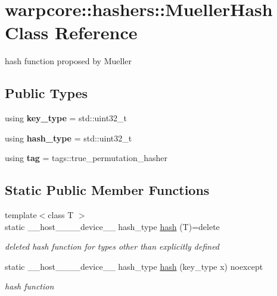 \hypertarget{classwarpcore_1_1hashers_1_1MuellerHash}{}\section{warpcore\+:\+:hashers\+:\+:Mueller\+Hash Class Reference}
\label{classwarpcore_1_1hashers_1_1MuellerHash}


hash function proposed by Mueller  


\subsection*{Public Types}
\begin{DoxyCompactItemize}
\item 
\mbox{\label{classwarpcore_1_1hashers_1_1MuellerHash_a14b100811e97a47b6ba363ee092f664a}} 
using {\bfseries key\+\_\+type} = std\+::uint32\+\_\+t
\item 
\mbox{\label{classwarpcore_1_1hashers_1_1MuellerHash_a9085ddbded055d883f0f7a45b989a33e}} 
using {\bfseries hash\+\_\+type} = std\+::uint32\+\_\+t
\item 
\mbox{\label{classwarpcore_1_1hashers_1_1MuellerHash_adf2a377e994efb65673b4db651e0a2df}} 
using {\bfseries tag} = tags\+::true\+\_\+permutation\+\_\+hasher
\end{DoxyCompactItemize}
\subsection*{Static Public Member Functions}
\begin{DoxyCompactItemize}
\item 
{\footnotesize template$<$class T $>$ }\\static \+\_\+\+\_\+host\+\_\+\+\_\+\+\_\+\+\_\+device\+\_\+\+\_\+ hash\+\_\+type \hyperlink{classwarpcore_1_1hashers_1_1MuellerHash_af2d2d88d32709788964af04198e4f60c}{hash} (T)=delete
\begin{DoxyCompactList}\small\item\em deleted hash function for types other than explicitly defined \end{DoxyCompactList}\item 
static \+\_\+\+\_\+host\+\_\+\+\_\+\+\_\+\+\_\+device\+\_\+\+\_\+ hash\+\_\+type \hyperlink{classwarpcore_1_1hashers_1_1MuellerHash_aa02ad6cfc87f45c9c16fb563811f8919}{hash} (key\+\_\+type x) noexcept
\begin{DoxyCompactList}\small\item\em hash function \end{DoxyCompactList}\end{DoxyCompactItemize}


